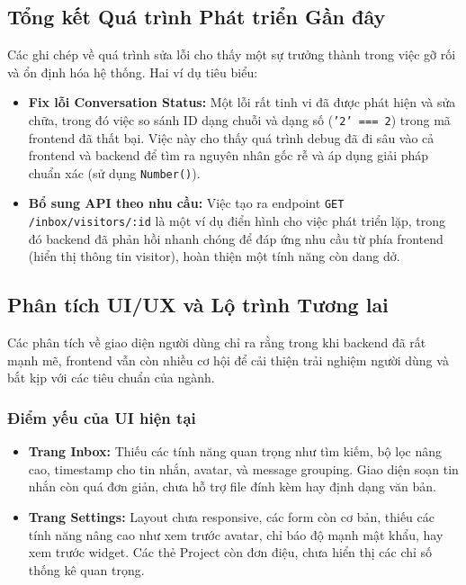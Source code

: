 \subsection{Tổng kết Quá trình Phát triển Gần đây}
\label{subsec:development-summary}

Các ghi chép về quá trình sửa lỗi cho thấy một sự trưởng thành trong việc gỡ rối và ổn định hóa hệ thống. Hai ví dụ tiêu biểu:

\begin{itemize}
    \item \textbf{Fix lỗi Conversation Status:} Một lỗi rất tinh vi đã được phát hiện và sửa chữa, trong đó việc so sánh ID dạng chuỗi và dạng số (\texttt{'2' === 2}) trong mã frontend đã thất bại. Việc này cho thấy quá trình debug đã đi sâu vào cả frontend và backend để tìm ra nguyên nhân gốc rễ và áp dụng giải pháp chuẩn xác (sử dụng \texttt{Number()}).
    
    \item \textbf{Bổ sung API theo nhu cầu:} Việc tạo ra endpoint \texttt{GET /inbox/visitors/:id} là một ví dụ điển hình cho việc phát triển lặp, trong đó backend đã phản hồi nhanh chóng để đáp ứng nhu cầu từ phía frontend (hiển thị thông tin visitor), hoàn thiện một tính năng còn dang dở.
\end{itemize}

\subsection{Phân tích UI/UX và Lộ trình Tương lai}
\label{subsec:ui-ux-roadmap}

Các phân tích về giao diện người dùng chỉ ra rằng trong khi backend đã rất mạnh mẽ, frontend vẫn còn nhiều cơ hội để cải thiện trải nghiệm người dùng và bắt kịp với các tiêu chuẩn của ngành.

\subsubsection{Điểm yếu của UI hiện tại}
\begin{itemize}
    \item \textbf{Trang Inbox:} Thiếu các tính năng quan trọng như tìm kiếm, bộ lọc nâng cao, timestamp cho tin nhắn, avatar, và message grouping. Giao diện soạn tin nhắn còn quá đơn giản, chưa hỗ trợ file đính kèm hay định dạng văn bản.
    \item \textbf{Trang Settings:} Layout chưa responsive, các form còn cơ bản, thiếu các tính năng nâng cao như xem trước avatar, chỉ báo độ mạnh mật khẩu, hay xem trước widget. Các thẻ Project còn đơn điệu, chưa hiển thị các chỉ số thống kê quan trọng.
\end{itemize}

